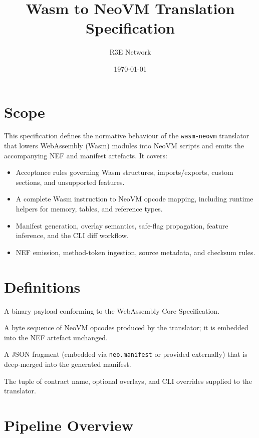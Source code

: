 \documentclass[11pt]{article}
\title{Wasm to NeoVM Translation Specification}
\author{R3E Network}
\date{\today}
\begin{document}
\setlength{\emergencystretch}{2em}
\sloppy
\hfuzz=2pt
\maketitle
\tableofcontents
\newpage

\section{Scope}
This specification defines the normative behaviour of the \texttt{wasm-neovm} translator that lowers WebAssembly (Wasm) modules into NeoVM scripts and emits the accompanying NEF and manifest artefacts. It covers:
\begin{itemize}[nosep]
    \item Acceptance rules governing Wasm structures, imports/exports, custom sections, and unsupported features.
    \item A complete Wasm instruction to NeoVM opcode mapping, including runtime helpers for memory, tables, and reference types.
    \item Manifest generation, overlay semantics, safe-flag propagation, feature inference, and the CLI diff workflow.
    \item NEF emission, method-token ingestion, source metadata, and checksum rules.
\end{itemize}

\section{Definitions}
\begin{description}[style=unboxed,leftmargin=0cm]
    \item[Wasm module] A binary payload conforming to the WebAssembly Core Specification.
    \item[NeoVM script] A byte sequence of NeoVM opcodes produced by the translator; it is embedded into the NEF artefact unchanged.
    \item[Manifest overlay] A JSON fragment (embedded via \texttt{neo.manifest} or provided externally) that is deep-merged into the generated manifest.
    \item[Translation configuration] The tuple of contract name, optional overlays, and CLI overrides supplied to the translator.
\end{description}

\section{Pipeline Overview}
\end{document}
